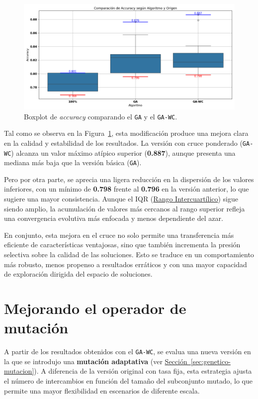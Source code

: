 \begin{figure}[htp]
  \centering
  \includegraphics[width=1\textwidth]{imagenes/evaluaciones/operador-de-cruce.png}
  \caption{Boxplot de \textit{accuracy} comparando el \texttt{GA} y el \texttt{GA-WC}.}
  \label{fig:cruce_ponderado}
\end{figure}

Tal como se observa en la Figura~\ref{fig:cruce_ponderado}, esta modificación produce una mejora clara en la calidad y estabilidad de los resultados.
La versión con cruce ponderado (\texttt{GA-WC}) alcanza un valor máximo atípico superior (\textbf{0.887}),
aunque presenta una mediana más baja que la versión básica (\texttt{GA}).

Pero por otra parte, se aprecia una ligera reducción en la dispersión de los valores inferiores,
con un mínimo de \textbf{0.798} frente al \textbf{0.796} en la versión anterior, lo que sugiere una mayor consistencia.
Aunque el IQR (\hyperref[subsec:visualizacion-de-resultados]{Rango Intercuartílico}) sigue siendo amplio,
la acumulación de valores más cercanos al rango superior refleja una convergencia evolutiva más enfocada y menos dependiente del azar.

En conjunto, esta mejora en el cruce no solo permite una transferencia más eficiente de características ventajosas,
sino que también incrementa la presión selectiva sobre la calidad de las soluciones.
Esto se traduce en un comportamiento más robusto, menos propenso a resultados erráticos y con una mayor capacidad de exploración dirigida del espacio de soluciones.


\section{Mejorando el operador de mutación}\label{sec:mejorando-mutacion}
A partir de los resultados obtenidos con el \texttt{GA-WC}, se evalua una nueva versión en la que se introdujo una \textbf{mutación adaptativa}
(ver \hyperref[sec:genetico-mutacion]{Sección~\ref*{sec:genetico-mutacion}}).
A diferencia de la versión original con tasa fija, esta estrategia ajusta el número de intercambios en función del tamaño del subconjunto mutado,
lo que permite una mayor flexibilidad en escenarios de diferente escala.

